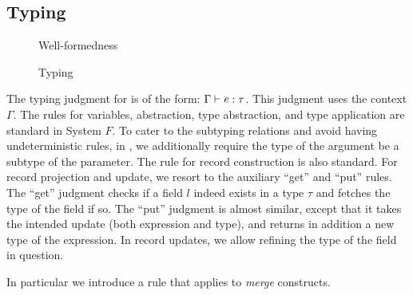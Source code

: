 
\subsection{Typing}

\begin{figure}

\caption{Well-formedness}
\end{figure}

\begin{figure}



\caption{Typing}
\end{figure}

The typing judgment for \name is of the form: $ \Gamma \vdash e : \tau $. This
judgment uses the context $ \Gamma $. The rules for variables, abstraction, type
abstraction, and type application are standard in System $ F $. To cater to the
subtyping relations and avoid having undeterministic rules, in ,
we additionally require the type of the argument be a subtype of the parameter.
The rule for record construction is also standard. For record projection and
update, we resort to the auxiliary ``get'' and ``put'' rules. The ``get''
judgment checks if a field $ l $ indeed exists in a type $ \tau $ and fetches the
type of the field if so. The ``put'' judgment is almost similar, except that it
takes the intended update (both expression and type), and returns in addition a
new type of the expression. In record updates, we allow refining the type of the
field in question.


In particular we introduce a
 rule that applies to \emph{merge}
constructs.


